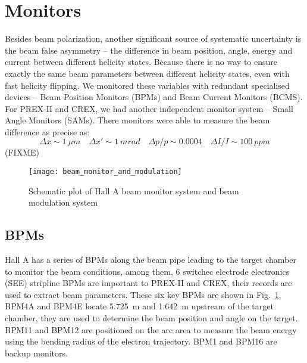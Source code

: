 \section{Monitors}
Besides beam polarization, another significant source of systematic uncertainty
is the beam false asymmetry -- the difference in beam position, angle, energy and
current between different helicity states. Because there is no way to ensure
exactly the same beam parameters between different helicity states, even with fast
helicity flipping. We monitored these variables with redundant specialised devices
-- Beam Position Monitors (BPMs) and Beam Current Monitors (BCMS). For PREX-II
and CREX, we had another independent monitor system -- Small Angle Monitors (SAMs).
There monitors were able to measure the beam difference as precise as:
$$ \Delta x \sim 1\ \mu m \quad \Delta x' \sim 1\ mrad \quad \Delta p/p \sim 0.0004 \quad \Delta I/I \sim 100 \ ppm$$ (FIXME)
\begin{figure}[h!]
    \centering
    \texttt{[image: beam\_monitor\_and\_modulation]}
    \caption{Schematic plot of Hall A beam monitor system and beam modulation system}
    \label{fig:hall_a_monitors_and_modulation}
\end{figure}

\begin{comment}
    \begin{itemize}
	\item beam correlations
	\item monitor precision (resolution): double difference width
	\item noise
	\item pedestal: calibration
	\item cross-correlation
    \end{itemize}
\end{comment}

\subsection{BPMs}
\begin{comment}
Cross check, and unfold beam fluctuation noise from instrumentation noise
\end{comment}
Hall A has a series of BPMs along the beam pipe leading to the target chamber
to monitor the beam conditions, among them, 6 switchec electrode electronics (SEE) 
stripline BPMs are important to PREX-II and CREX, 
their records are used to extract beam parameters. These six
key BPMs are shown in Fig.~\ref{fig:hall_a_monitors_and_modulation}. 
BPM4A and BPM4E locate 5.725~m and 1.642~m upstream of the target chamber, 
they are used to determine the beam position and angle on the target. BPM11 and BPM12
are positioned on the arc area to measure the beam energy using the bending 
radius of the electron trajectory. BPM1 and BPM16 are backup monitors.

